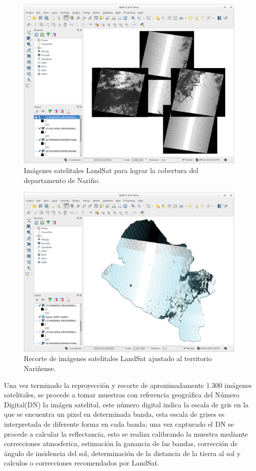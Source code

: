 \begin{figure}[htb]
  \centering 
  \includegraphics[scale=0.15]{pictures/cut1.png}
  \caption{Imágenes satelitales LandSat para lograr la cobertura del departamento de Nariño.} 
  \label{fig:nl7u}
\end{figure}
\begin{figure}[htb]
  \centering 
  \includegraphics[scale=0.15]{pictures/cut2.png}
  \caption{Recorte de imágenes satelitales LandSat ajustado al territorio Nariñense.} 
  \label{fig:nl7c}
\end{figure}

Una vez terminado la reproyección y recorte de aproximadamente 1.300 imágenes satelitales, se procede a tomar muestras con referencia geográfica del Número 
Digital(DN) la imágen satelital, este número digital indica la escala de gris en la que se encuentra un pixel en determinada banda, esta escala de grises es 
interpretada de diferente forma en cada banda; una vez capturado el DN se procede a calcular la reflectancia, esto se realiza calibrando la muestra mediante 
correcciones atmosferica, estimación la ganancia de las bandas, corrección de ángulo de insidencia del sol, determinación de la distancia de la tierra al sol 
y calculos o correcciones recomendados por LandSat\cite{gasparri2007utilidad}.

